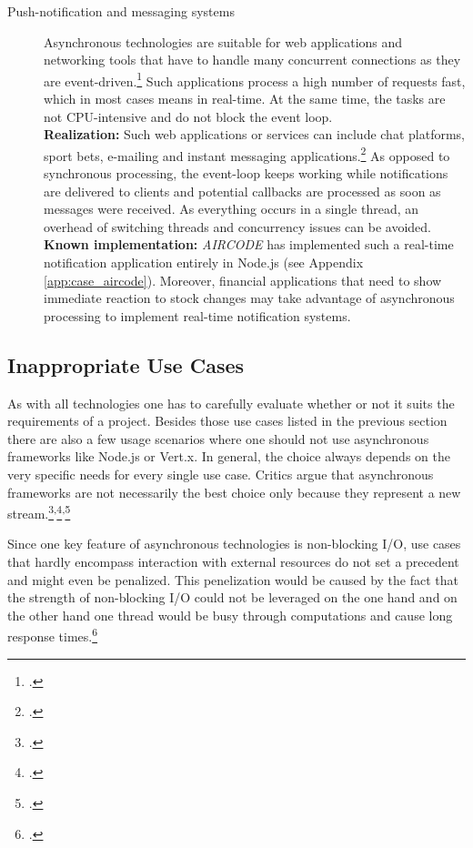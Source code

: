 \begin{description}
\item[Push-notification and messaging systems] Asynchronous technologies are
suitable for web applications and networking tools that have to handle many
concurrent connections as they are event-driven.\footcite[Cf.][17]{teixeira_2012} Such applications process a
high number of requests fast, which in most cases means in real-time. At the
same time, the tasks are not CPU-intensive and do not block the event loop. \\
\textbf{Realization:} Such web applications or services can include chat
platforms, sport bets, e-mailing and instant messaging
applications.\footcite[Cf.][]{GeisendoerferF_2011} As opposed to synchronous
processing, the event-loop keeps working while notifications are delivered to
clients and potential callbacks are processed as soon as messages were received.
As everything occurs in a single thread, an overhead of switching threads and
concurrency issues can be avoided.\\
\textbf{Known implementation:} \textit{AIRCODE} has implemented such a real-time
notification application entirely in Node.js (see Appendix \ref{app:case_aircode}). Moreover,
financial applications that need to show immediate reaction to stock
changes may take advantage of asynchronous processing to implement real-time notification systems.

\end{description}



\subsection{Inappropriate Use Cases}
\label{dont_use_cases}

As with all technologies one has to carefully evaluate whether or not it suits the
requirements of a project. Besides those use cases listed in the previous
section there are also a few usage scenarios where one should not use
asynchronous frameworks like Node.js or Vert.x. In general, the choice
always depends on the very specific needs for every single use case.
Critics argue that asynchronous frameworks are not necessarily the best choice
only because they represent a new stream.\footcite[Cf.][]{semerau_2011}\textsuperscript{,}\footcite[Cf.][]{arranz_2011}\textsuperscript{,}\footcite[Cf.][]{behren_2003}

Since one key feature of asynchronous technologies is non-blocking I/O, use
cases that hardly encompass interaction with external resources do not set a
precedent and might even be penalized. This penelization would be caused by the
fact that the strength of non-blocking I/O could not be leveraged on the one
hand and on the other hand one thread would be busy through computations and
cause long response times.\footcite[Cf.][14]{Roden_2012}

